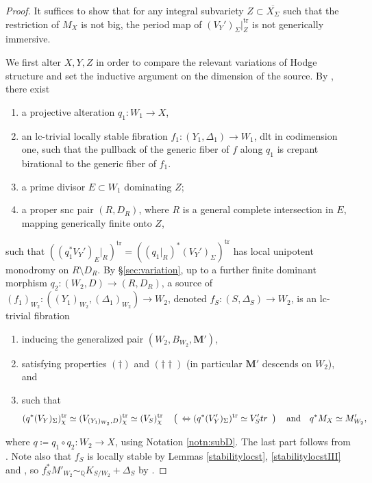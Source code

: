 \documentclass{amsart}
\theoremstyle{definition}
\theoremstyle{remark}
\def\bQ{\mathbb{Q}}
\newcommand\bfM{{\bf M}}
\def\trans{\mathrm{tr}}
\def\bfM{\mathbf{M}}
\numberwithin{equation}{section}
\begin{document}
\begin{proof}
It suffices to show that for any integral subvariety $Z \subset \overline{X_{\Sigma}}$ such that the restriction of $M_X$ is not big, the period map of $(V_Y')_{\Sigma}|_Z^\trans$ is not generically immersive.

We first alter $X, Y, Z$ in order to compare the relevant variations of Hodge structure and set the inductive argument on the dimension of the source. By , there exist
\begin{enumerate}
\item a projective alteration $q_1 \colon W_1 \to X$,
\item an lc-trivial locally stable fibration $f_1 \colon (Y_{1}, \Delta_1) \to W_1$, dlt in codimension one,  such that the pullback of the generic fiber of $f$ along $q_1$ is crepant birational to the generic fiber of $f_1$.
\item a prime divisor $E \subset W_{1}$ dominating $Z$; 
\item a proper snc pair $(R, D_{R})$, where $R$ is a general complete intersection in $E$, mapping generically finite onto $Z$,
\end{enumerate}
such that $((q_1^*V_Y')_{E}|_R)^\trans=((q_1|_R)^*(V_Y')_\Sigma)^\trans$
has local unipotent monodromy on $R \setminus D_{R}$. By \S \ref{sec:variation}, up to a further finite dominant morphism $q_2 \colon (W_2,D) \to (R,D_R)$, a source of $(f_1)_{W_2} \colon ((Y_{1})_{W_2}, (\Delta_{1})_{W_2}) \to W_2$, denoted $f_{S} \colon (S, \Delta_S) \to W_2$, is an lc-trivial fibration
\begin{enumerate}
\item inducing the generalized pair $(W_2, B_{W_2}, \bfM')$, 
\item satisfying properties $(\dagger)$ and $(\dagger\dagger)$ (in particular $\bfM'$  descends on $W_2$), and
\item such that
\begin{equation}\label{eq:variationIII}
(q^*(V_{Y})_\Sigma)^{\trans}_\chi\simeq (V_{(Y_1)_{W_2},D})^\trans_\chi \simeq (V_{S})^{\trans}_\chi\quad \left(\hspace{.5em}\Leftrightarrow (q^*(V'_Y)_\Sigma)^\trans\simeq V_S'^\trans\hspace{.5em}\right) \quad \text{and}\quad q^*M_{X} \simeq M'_{W_2},
\end{equation}
\end{enumerate}
where $q \coloneqq q_1 \circ q_2 \colon W_2 \to X$, using Notation \ref{notn:subD}.  The last part follows from . Note also that $f_S$ is locally stable by Lemmas \ref{stabilitylocst}, \ref{stabilitylocstIII} and \cite[cf. proof of Lem. 2.11]{kbook}, so $f_S^*M'_{W_2} \sim_{\bQ} K_{S/W_2} + \Delta_S$ by .


\end{proof}
\end{document}
